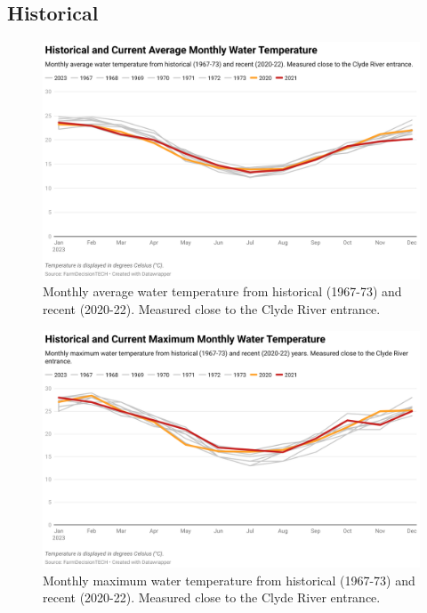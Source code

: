 \documentclass[10pt]{article}
\begin{document}
\subsection{Historical}

\begin{figure}[H]
\centering
\includegraphics[width=\textwidth]{combined-historical-temperature-mean.png}
\caption[Historical Average Water Temperature]{Monthly average water temperature from historical (1967-73) and recent (2020-22). Measured close to the Clyde River entrance.}
\end{figure}

\begin{figure}[H]
\centering
\includegraphics[width=\textwidth]{combined-historical-temperature-max.png}
\caption[Historical Maximum Water Temperature]{Monthly maximum water temperature from historical (1967-73) and recent (2020-22). Measured close to the Clyde River entrance.}
\end{figure}
\end{document}
